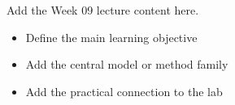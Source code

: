 Add the Week 09 lecture content here.

\begin{itemize}
  \item Define the main learning objective
  \item Add the central model or method family
  \item Add the practical connection to the lab
\end{itemize}
